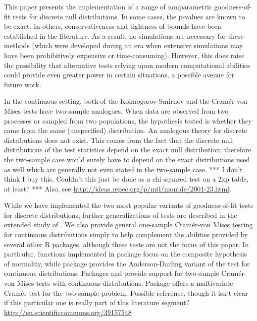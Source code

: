 This paper presents the implementation of a range of nonparametric
goodness-of-fit tests for discrete null distributions.  In some cases,
the p-values are known to be exact.  In others, conservativeness 
and tightness of bounds have been established in the literature.  As a result,
no simulations are necessary for these methods (which were developed during
an era when extensive simulations may have been prohibitively expensive
or time-consuming).
However, this does raise the possibility that alternative tests relying upon
modern computational abilities could provide even greater power in certain
situations, a possible avenue for future work.



In the continuous setting, both of 
the Kolmogorov-Smirnov and the Cram\'{e}r-von Mises tests
have two-sample analogues. When data are
observed from two processes or sampled from two populations, 
the hypothesis tested is 
whether they came from the same (unspecified) distribution. An
analogous theory for discrete distributions does not exist.
This comes from the fact that the discrete null distributions
of the test statistics depend on the exact null distribution; 
therefore the two-sample case would surely have to depend
on the exact distributions used as well %
which are generally not even stated in the two-sample case. 
*** I don't think I buy this. Couldn't this just be done as a
chi-squared test on a 2xp table, at least? *** Also,
see \url{http://ideas.repec.org/p/mtl/montde/2001-23.html}.

While we have implemented the two most popular variants of 
goodness-of-fit tests for discrete distributions, further 
generalizations of tests are described in the
extended study of \cite{dewev1973}.  We also provide general one-sample
Cram\'{e}r-von Mises testing for continuous distributions simply
to help complement the abilities provided by several other
R packages, although these tests are not the focus of this paper.
In particular, functions implemented in package  focus on the
composite hypothesis of normality, while
package  provides the Anderson-Darling variant
of the test for continuous distributions.  Packages
 and  provide support for
two-sample Cram\'{e}r-von Mises tests with continuous distributions.
Package  offers a multivariate Cram\'{e}r test for
the two-sample problem.  Possible reference, though it isn't clear
if this particular one is really part of this literature segment?
\url{http://en.scientificcommons.org/39157548}

